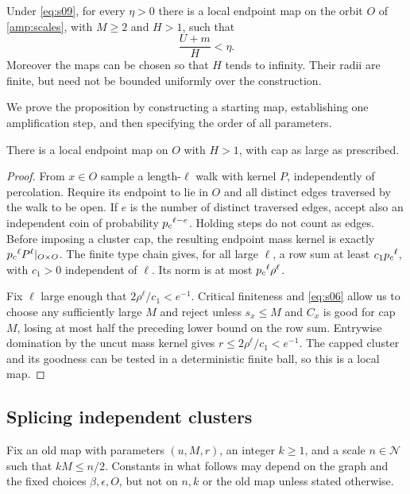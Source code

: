 \begin{proposition}\label{amp:efficient-maps}
Under \eqref{eq:s09}, for every $\eta>0$ there is a local endpoint map on
the orbit $O$ of \cref{amp:scales}, with $M\ge2$ and $H>1$, such that
\[
 \frac{U+m}{H}<\eta.
\]
Moreover the maps can be chosen so that $H$ tends to infinity.  Their
radii are finite, but need not be bounded uniformly over the construction.
\end{proposition}

We prove the proposition by constructing a starting map, establishing
one amplification step, and then specifying the order of all parameters.

\begin{lemma}\label{amp:initial}
There is a local endpoint map on $O$ with $H>1$, with cap as large as
prescribed.
\end{lemma}

\begin{proof}
From $x\in O$ sample a length-$\ell$ walk with kernel $P$, independently of
percolation.  Require its endpoint to lie in $O$ and all distinct edges
traversed by the walk to be open.  If $e$ is the number of distinct
traversed edges, accept also an independent coin of probability
${p_c}^{\ell-e}$.  Holding steps do not count as edges.  Before imposing a
cluster cap, the resulting endpoint mass kernel is exactly
${p_c}^\ell P^\ell|_{O\times O}$.  The finite type chain gives, for all large
$\ell$, a row sum at least $c_1{p_c}^\ell$, with $c_1>0$ independent of
$\ell$.  Its norm is at most ${p_c}^\ell\rho^\ell$.

Fix $\ell$ large enough that $2\rho^\ell/c_1<e^{-1}$.  Critical finiteness
and \eqref{eq:s06} allow us to choose any sufficiently large $M$ and reject
unless $s_x\le M$ and $C_x$ is good for cap $M$, losing at most half the
preceding lower bound on the row sum.  Entrywise domination by the uncut
mass kernel gives $r\le2\rho^\ell/c_1<e^{-1}$.  The capped cluster and its
goodness can be tested in a deterministic finite ball, so this is a local
map.
\end{proof}

\subsection{Splicing independent clusters}\label{amp:splicing-section}

Fix an old map with parameters $(u,M,r)$, an integer $k\ge1$, and a scale
$n\in\mathcal N$ such that $kM\le n/2$.  Constants in what follows may
depend on the graph and the fixed choices $\beta,\epsilon,O$, but not on
$n,k$ or the old map unless stated otherwise.

